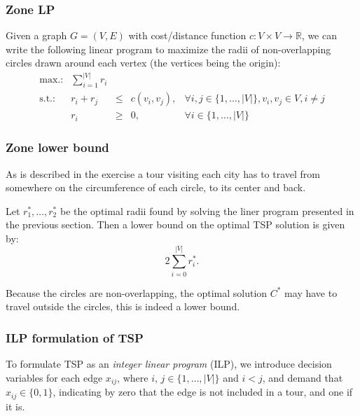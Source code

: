 \documentclass{article}
\begin{document}
\subsubsection*{Zone LP}
Given a graph $G = (V,E)$ with cost/distance function $c : V \times V
\rightarrow \mathbb{R}$, we can write the following linear program to
maximize the radii of non-overlapping circles drawn around each vertex
(the vertices being the origin):
\[
\begin{array}{lrcll}
\textrm{max.:} & \displaystyle\sum_{i=1}^{|V|} r_i  & & & \\
\textrm{s.t.:} &  r_i+r_j                &\leq & c(v_i,v_j), & \forall i,j\in \{1,\dots,|V|\}, v_i, v_j\in V, i \not = j \\
& r_i &\geq & 0, & \forall i \in \{1,\dots,|V|\}
\end{array}
\]

\subsubsection*{Zone lower bound}

As is described in the exercise a tour visiting each city has to
travel from somewhere on the circumference of each circle, to its
center and back.

Let $r_1^*,\dots,r_2^*$ be the optimal radii found by solving the
liner program presented in the previous section. Then a lower bound on
the optimal TSP solution is given by:
\[
2\sum_{i=0}^{|V|}r_i^*.
\]

Because the circles are non-overlapping, the optimal solution $C^*$ may
have to travel outside the circles, this is indeed a lower bound.

\subsubsection*{ILP formulation of TSP}

To formulate TSP as an \emph{integer linear program} (ILP), we
introduce decision variables for each edge $x_{ij}$, where $i$, $j \in
\{1,\dots,|V|\}$ and $i<j$, and demand that $x_{ij}\in\{0,1\}$, indicating by
zero that the edge is not included in a tour, and one if it is.
\end{document}
